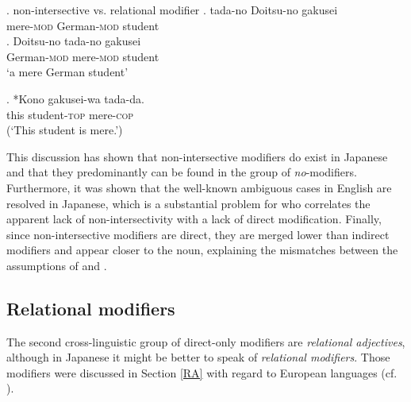 \ex. \label{tada} non-intersective vs. relational modifier
\ag. tada-no Doitsu-no gakusei\\
mere-\textsc{mod} German-\textsc{mod} student \label{tada1}\\
\bg. Doitsu-no tada-no gakusei\\
German-\textsc{mod} mere-\textsc{mod} student\\
`a mere German student' \label{tada2}

\exg. *Kono gakusei-wa tada-da.\\
this student-\textsc{top} mere-\textsc{cop}\\
(`This student is mere.’) \label{tadada}

This discussion has shown that non-intersective modifiers do exist in Japanese and that they predominantly can be found in the group of \textit{no}-modifiers. Furthermore, it was shown that the well-known ambiguous cases in  English are resolved in Japanese, which is a substantial problem for \citet{baker:2003:verbal} who correlates the apparent lack of non-intersectivity with a lack of direct modification. Finally, since non-intersective modifiers are direct, they are merged lower than indirect modifiers and appear closer to the noun, explaining the mismatches between the assumptions of \citet{svenonius:2008:position} and \citet{ayano:2010:revisiting}.

\subsection{Relational modifiers}
\label{RAJapanese}

The second cross-linguistic group of direct-only modifiers are \textit{relational adjectives}, although in Japanese it might be better to speak of \textit{relational modifiers}. Those modifiers were discussed in Section \ref{RA} with regard to European languages (cf. \citealt{fabregas:2007:internal, rainer:2013:can, bortolotto:2016:RA}).

